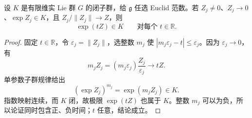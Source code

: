 \begin{lemma}\label{g1:lem:closed-subgroup-limit-direction}
	设 \(K\) 是有限维实 Lie 群 \(G\) 的闭子群，给 \(\mathfrak g\) 任选 Euclid 范数。若 \(Z_j\ne0\)、\(Z_j\to0\)、\(\exp Z_j\in K\)，且 \(Z_j/\lVert Z_j\rVert\to Z\)，则
	\[
		\exp(tZ)\in K\qquad\text{对每个 }t\in\mathbb R.
	\]
\end{lemma}
\begin{proof}
	固定 \(t\in\mathbb R\)，令 \(\varepsilon_j=\lVert Z_j\rVert\)，选整数 \(m_j\) 使 \(|m_j\varepsilon_j-t|\le\varepsilon_j\)。因为 \(\varepsilon_j\to0\)，有
	\[
		m_jZ_j=(m_j\varepsilon_j)\frac{Z_j}{\varepsilon_j}\longrightarrow tZ.
	\]
	单参数子群规律给出
	\[
		(\exp Z_j)^{m_j}=\exp(m_jZ_j)\in K.
	\]
	指数映射连续，而 \(K\) 闭，故极限 \(\exp(tZ)\) 也属于 \(K\)。整数 \(m_j\) 可以为负，所以论证同时包含正、负时间；\(t\) 任意，结论成立。
\end{proof}

